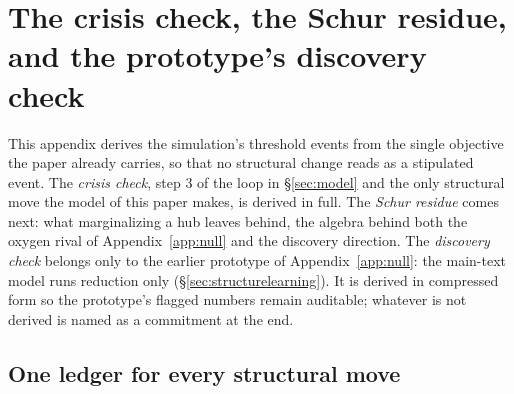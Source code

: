
\section{The crisis check, the Schur residue, and the prototype's discovery check}
\label{app:crisis-discovery}

This appendix derives the simulation's threshold events from the single objective the paper
already carries, so that no structural change reads as a stipulated event. The \emph{crisis
check}, step 3 of the loop in \S\ref{sec:model} and the only structural move the model of this
paper makes, is derived in full. The \emph{Schur residue} comes next: what marginalizing a
hub leaves behind, the algebra behind both the oxygen rival of Appendix~\ref{app:null} and
the discovery direction. The \emph{discovery check} belongs only to the earlier prototype of
Appendix~\ref{app:null}: the main-text model runs reduction only
(\S\ref{sec:structurelearning}). It is derived in compressed form so the prototype's flagged
numbers remain auditable; whatever is not derived is named as a commitment at the
end.

\subsection{One ledger for every structural move}

